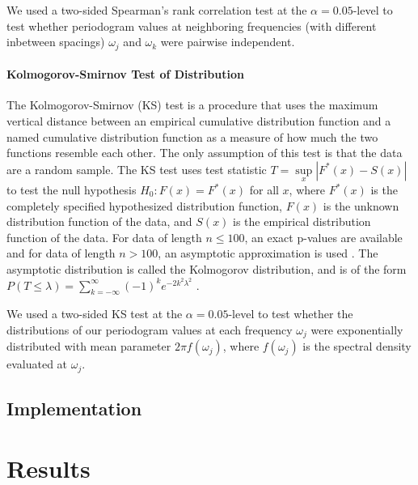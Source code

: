 \documentclass{article}\usepackage{graphicx, color}
\theoremstyle{plain}
\begin{document}
We used a two-sided Spearman's rank correlation test at the $\alpha = 0.05$-level to test whether periodogram values at neighboring frequencies (with different inbetween spacings) $\omega_j$ and $\omega_k$ were pairwise independent.


\paragraph{Kolmogorov-Smirnov Test of Distribution}
The Kolmogorov-Smirnov (KS) test is a procedure that uses the maximum vertical distance between an empirical cumulative distribution function and a named cumulative distribution function as a measure of how much the two functions resemble each other. The only assumption of this test is that the data are a random sample. The KS test uses test statistic $T = \sup\limits_x |F^*(x) - S(x)|$ to test the null hypothesis $H_0: F(x) = F^*(x)$ for all $x$, where $F^*(x)$ is the completely specified hypothesized distribution function, $F(x)$ is the unknown distribution function of the data, and $S(x)$ is the empirical distribution function of the data. For data of length $n \le 100$, an exact p-values are available and for data of length $n > 100$, an asymptotic approximation is used \cite{conover1998practical}. The asymptotic distribution is called the Kolmogorov distribution, and is of the form $P(T \le \lambda) = \sum_{k=-\infty}^\infty (-1)^k e^{-2k^2 \lambda^2}$ \cite{kolmogorov1992empirical}.

We used a two-sided KS test at the $\alpha = 0.05$-level to test whether the distributions of our periodogram values at each frequency $\omega_j$ were exponentially distributed with mean parameter $2\pi f(\omega_j)$, where $f(\omega_j)$ is the spectral density evaluated at $\omega_j$.




\subsection{Implementation}




\section{Results}
\end{document}
